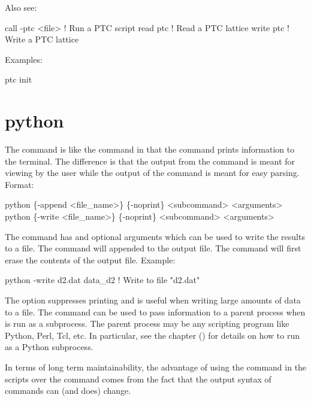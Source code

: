 Also see:
\begin{example}
  call -ptc <file>         ! Run a PTC script
  read ptc                 ! Read a PTC lattice
  write ptc                ! Write a PTC lattice
\end{example}

Examples:
\begin{example}
  ptc init
\end{example}

\section{python}
\label{s:python}

The  command is like the  command in that the  command prints
information to the terminal. The difference is that the output from the  command is meant
for viewing by the user while the output of the  command is meant for easy
parsing. Format:
\begin{example}
  python \{-append <file_name>\} \{-noprint\} <subcommand> <arguments>
  python \{-write <file_name>\} \{-noprint\} <subcommand> <arguments>
\end{example}

The  command has  and  optional arguments which can be used to
write the results to a file. The  command will appended to the output file. The
 command will first erase the contents of the output file. Example:
\begin{example}
  python -write d2.dat data_d2    ! Write to file "d2.dat"
\end{example}

The  option suppresses printing and is useful when writing large amounts of data to a
file.  The  command can be used to pass information to a parent process when \tao is run
as a subprocess.  The parent process may be any scripting program like Python, Perl, Tcl, etc.  In
particular, see the  chapter () for details on how to run
\tao as a Python subprocess.

In terms of long term maintainability, the advantage of using the  command in the scripts
over the  command comes from the fact that the output syntax of  commands can (and
does) change.

